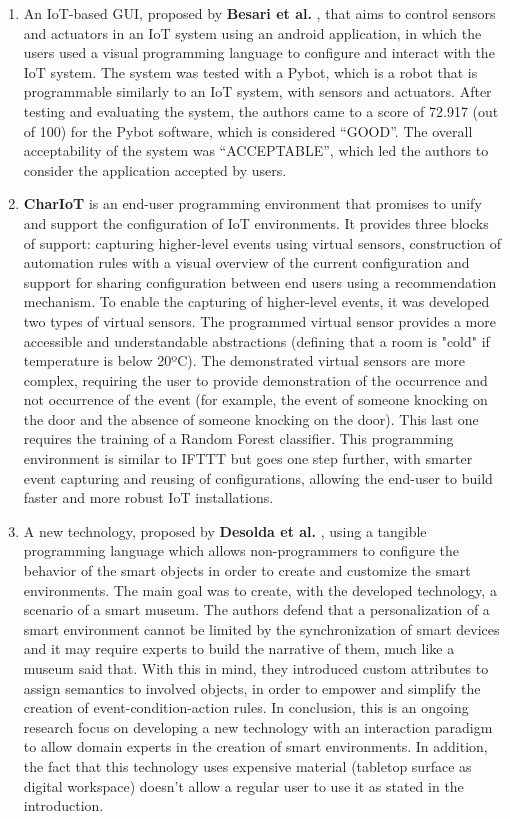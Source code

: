 \begin{enumerate}
    \item An IoT-based GUI, proposed by \textbf{Besari et al.} \cite{mobile_apps_rpi} \cite{pre_mobile_apps_rpi}, that aims to control sensors and actuators in an IoT system using an android application, in which the users used a visual programming language to configure and interact with the IoT system. The system was tested with a Pybot, which is a robot that is programmable similarly to an IoT system, with sensors and actuators. After testing and evaluating the system, the authors came to a score of 72.917 (out of 100) for the Pybot software, which is considered “GOOD”. The overall acceptability of the system was “ACCEPTABLE”, which led the authors to consider the application accepted by users.
    \item \textbf{CharIoT} \cite{chariot} is an end-user programming environment that promises to unify and support the configuration of IoT environments. It provides three blocks of support: capturing higher-level events using virtual sensors, construction of automation rules with a visual overview of the current configuration and support for sharing configuration between end users using a recommendation mechanism. To enable the capturing of higher-level events, it was developed two types of virtual sensors. The programmed virtual sensor provides a more accessible and understandable abstractions (defining that a room is "cold" if temperature is below 20ºC). The demonstrated virtual sensors are more complex, requiring the user to provide demonstration of the occurrence and not occurrence of the event (for example, the event of someone knocking on the door and the absence of someone knocking on the door). This last one requires the training of a Random Forest classifier. This programming environment is similar to IFTTT but goes one step further, with smarter event capturing and reusing of configurations, allowing the end-user to build faster and more robust IoT installations.
    \item A new technology, proposed by \textbf{Desolda et al.} \cite{desolda}, using a tangible programming language which allows non-programmers to configure the behavior of the smart objects in order to create and customize the smart environments. The main goal was to create, with the developed technology, a scenario of a smart museum. The authors defend that a personalization of a smart environment cannot be limited by the synchronization of smart devices and it may require experts to build the narrative of them, much like a museum said that. With this in mind, they introduced custom attributes to assign semantics to involved objects, in order to empower and simplify the creation of event-condition-action rules. In conclusion, this is an ongoing research focus on developing a new technology with an interaction paradigm to allow domain experts in the creation of smart environments. In addition, the fact that this technology uses expensive material (tabletop surface as digital workspace) doesn’t allow a regular user to use it as stated in the introduction.

\end{enumerate}
